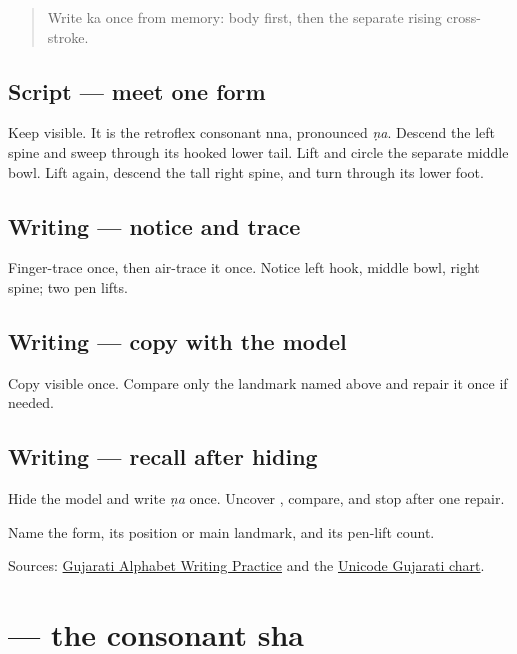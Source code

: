 \label{lesson:GU-W03-nna}



\begin{quote}
Write ka once from memory: body first, then the separate rising cross-stroke.
\end{quote}

\subsection*{Script — meet one form}
Keep \textbf{} visible. It is the retroflex consonant nna, pronounced \emph{ṇa}. Descend the left spine and sweep through its hooked lower tail. Lift and circle the separate middle bowl. Lift again, descend the tall right spine, and turn through its lower foot.

\subsection*{Writing — notice and trace}

Finger-trace \textbf{} once, then air-trace it once. Notice left hook, middle bowl, right spine; two pen lifts.

\subsection*{Writing — copy with the model}
Copy visible \textbf{} once. Compare only the landmark named above and repair it once if needed.

\subsection*{Writing — recall after hiding}
Hide the model and write \emph{ṇa} once. Uncover \textbf{}, compare, and stop after one repair.

\begin{tcolorbox}[breakable,colback=teal!4,colframe=teal!35!black,title={Before you move on}]
Name the form, its position or main landmark, and its pen-lift count.

Sources: \href{https://www.t30apps.com/gujarati-alphabet-writing/}{Gujarati Alphabet Writing Practice} and the \href{https://www.unicode.org/charts/PDF/U0A80.pdf}{Unicode Gujarati chart}.
\end{tcolorbox}
\section[\texorpdfstring{\gu{શ} (sha)}{શ (sha)}]{ — the consonant sha}

